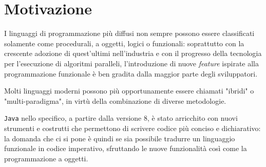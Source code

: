 \section{Motivazione}
\label{sec:1-1-motivation}

I linguaggi di programmazione più diffusi non sempre possono essere classificati
solamente come procedurali, a oggetti, logici o funzionali: soprattutto con la crescente adozione di quest'ultimi
nell'industria e con il progresso della tecnologia per l'esecuzione di algoritmi paralleli, l'introduzione di nuove \textit{feature}
ispirate alla programmazione funzionale è ben gradita dalla maggior parte degli sviluppatori.

\noindent Molti linguaggi moderni possono più opportunamente essere chiamati "ibridi" o "multi-paradigma",
in virtù della combinazione di diverse metodologie.


\texttt{Java} nello specifico, a partire dalla versione 8, è stato arricchito con nuovi strumenti e costrutti
che permettono di scrivere codice più conciso e dichiarativo: la domanda che ci si pone è quindi se sia possibile tradurre
un linguaggio funzionale in codice imperativo, sfruttando le nuove funzionalità così come la programmazione a oggetti.